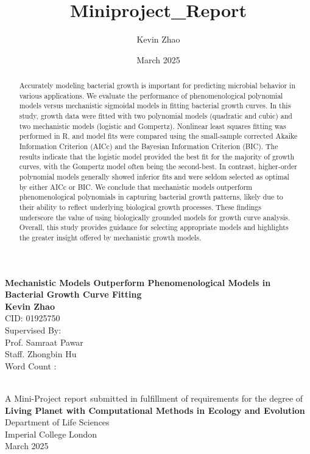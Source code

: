 \documentclass[11pt]{article}
\title{Miniproject_Report}
\author{Kevin Zhao}
\date{March 2025}
\newcommand\wordcount{
    \immediate\write18{texcount -1 -sum -merge \jobname.tex > \jobname-words.sum }
    
}
\begin{document}
\begin{titlepage}
    \begin{center}
    \vspace{1.75cm}
    \Large
        \textbf{Mechanistic Models Outperform Phenomenological Models in Bacterial Growth Curve Fitting}
        \vspace{2.5cm}\\
        \textbf{Kevin Zhao}\\
        CID: 01925750\\
        \vspace{1.5cm}
        \large
        Supervised By:\\
        Prof. Samraat Pawar\\
        Staff. Zhongbin Hu\\
        \vspace{1.5cm}
        Word Count :\wordcount{} \\
        \vspace{4cm}
        A Mini-Project report submitted in fulfillment of requirements for the degree of \textbf{Living Planet with Computational Methods in Ecology and Evolution}\\
        \vspace{1.5cm}
        Department of Life Sciences\\
        Imperial College London\\
        March 2025
    \end{center}
\end{titlepage}

\begin{abstract}
Accurately modeling bacterial growth is important for predicting microbial behavior in various applications. We evaluate the performance of phenomenological polynomial models versus mechanistic sigmoidal models in fitting bacterial growth curves. In this study, growth data were fitted with two polynomial models (quadratic and cubic) and two mechanistic models (logistic and Gompertz). Nonlinear least squares fitting was performed in R, and model fits were compared using the small-sample corrected Akaike Information Criterion (AICc) and the Bayesian Information Criterion (BIC). The results indicate that the logistic model provided the best fit for the majority of growth curves, with the Gompertz model often being the second-best. In contrast, higher-order polynomial models generally showed inferior fits and were seldom selected as optimal by either AICc or BIC. We conclude that mechanistic models outperform phenomenological polynomials in capturing bacterial growth patterns, likely due to their ability to reflect underlying biological growth processes. These findings underscore the value of using biologically grounded models for growth curve analysis. Overall, this study provides guidance for selecting appropriate models and highlights the greater insight offered by mechanistic growth models.
\end{abstract}
\end{document}
